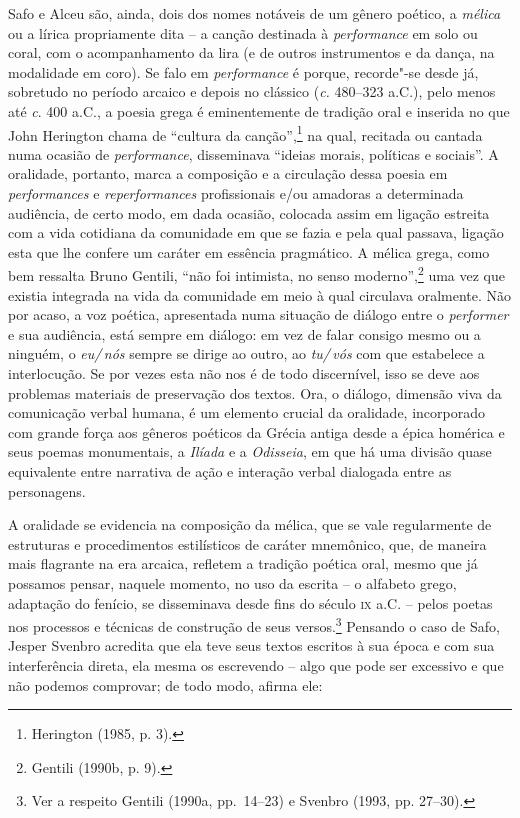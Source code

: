Safo e Alceu são, ainda, dois dos nomes notáveis de um gênero poético, a
\textit{mélica} ou a lírica propriamente dita -- a canção destinada à
\textit{performance} em solo ou coral,
com o acompanhamento da lira (e de outros instrumentos e da dança, na
modalidade em coro). Se falo em \textit{performance} é porque, recorde"-se
desde já, sobretudo no período arcaico e depois no clássico (\textit{c.}
480--323 a.C.), pelo menos até \textit{c}. 400 a.C., a poesia grega é eminentemente de tradição oral e inserida no
que John Herington chama de ``cultura da canção'',\footnote{ Herington (1985, p. 3).} na
qual, recitada ou cantada numa ocasião de \textit{performance}, disseminava
“ideias morais, políticas e sociais”. A oralidade, portanto, marca
a composição e a circulação dessa poesia em \textit{performances} e
\textit{reperformances} profissionais e/ou amadoras a determinada
audiência, de certo modo, em dada ocasião, colocada assim em ligação estreita
com a vida cotidiana da comunidade em que se fazia e pela qual passava, ligação
esta que lhe confere um caráter em essência pragmático. A mélica grega,
como bem ressalta Bruno Gentili, “não foi intimista, no senso
moderno”,\footnote{ Gentili (1990b, p. 9).} uma vez que existia integrada na
vida da comunidade em meio à qual
circulava oralmente. Não por acaso, a voz poética, apresentada numa
situação de diálogo entre o \textit{performer} e sua audiência, está sempre em
diálogo: em vez de falar consigo mesmo ou a ninguém, o \textit{eu/\,nós} sempre
se dirige ao outro, ao \textit{tu/\,vós} com que estabelece a interlocução. Se por
vezes esta não nos é de todo discernível, isso se deve aos problemas
materiais de preservação dos textos. Ora, o diálogo, dimensão viva da
comunicação verbal humana, é um elemento crucial da oralidade, incorporado com
grande força aos gêneros poéticos da Grécia antiga desde a épica homérica e
seus poemas monumentais, a \textit{Ilíada} e a \textit{Odisseia}, em que há uma
divisão quase equivalente entre narrativa de ação e interação verbal dialogada entre as personagens. 

A oralidade se evidencia na composição da mélica, que se vale regularmente de
estruturas e procedimentos estilísticos de caráter mnemônico, que,
de maneira mais flagrante na era arcaica, refletem a tradição poética oral,
mesmo que já possamos pensar, naquele momento, no uso da escrita -- o alfabeto
grego, adaptação do fenício, se disseminava desde fins do século \textsc{ix} a.C. --
pelos poetas nos processos e técnicas de construção de seus
versos.\footnote{ Ver a respeito Gentili (1990a, pp.~14--23) e Svenbro (1993, pp.
27--30).} Pensando o caso de Safo, Jesper Svenbro acredita
que ela teve seus textos escritos à sua época e com sua interferência direta,
ela mesma os escrevendo -- algo que pode ser excessivo e que não podemos
comprovar; de todo modo, afirma ele:

